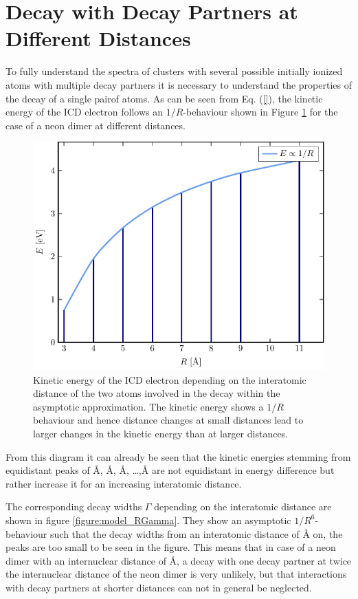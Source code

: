 \section{Decay with Decay Partners at Different Distances}
\label{sec:partners}

To fully understand the spectra of clusters with several possible
initially ionized atoms with multiple decay partners it is necessary to
understand the properties of the decay of a single pairof atoms. As can be seen
from Eq. (\ref{}), the kinetic energy of the ICD electron follows an
$1/R$-behaviour shown in Figure \ref{figure:model_RE} for the case
of a neon dimer at different distances.

\begin{figure}[h]
 \centering
 \includegraphics[width=\columnwidth]{pics/model_RE.pdf}
 \caption{Kinetic energy of the ICD electron depending on the interatomic
          distance of the two atoms involved in the decay within the
          asymptotic approximation. The kinetic energy shows a $1/R$
          behaviour and hence distance changes at small distances lead
          to larger changes in the kinetic energy than at larger distances.}
 \label{figure:model_RE}
\end{figure}
From this diagram it can already be
seen that the kinetic energies stemming from equidistant peaks of
\unit[3]{\AA}, \unit[4]{\AA}, \unit[5]{\AA}, \dots ,\unit[11]{\AA} are
not equidistant in energy difference but rather increase it for an increasing
interatomic distance.

The corresponding decay widths $\Gamma$ depending on the interatomic
distance are shown in figure \ref{figure:model_RGamma}. They show an
asymptotic $1/R^6$-behaviour such that the decay widths from an interatomic
distance of \unit[7]{\AA} on, the peaks are too small to be seen in the
figure. This means that in case of a neon dimer with an internuclear distance
of \unit[3]{\AA}, a decay with one decay partner at twice the internuclear
distance of the neon dimer is very unlikely, but that interactions with
decay partners at shorter distances can not in general be neglected.

